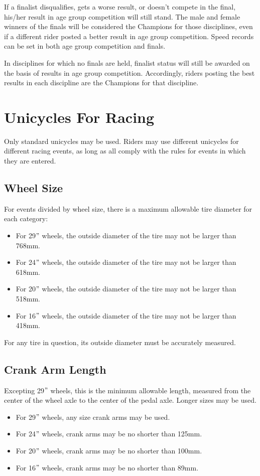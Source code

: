 If a finalist disqualifies, gets a worse result, or doesn’t compete in the final, his/her result in age group competition will still stand.
The male and female winners of the finals will be considered the Champions for those disciplines, even if a different rider posted a better result in age group competition.
Speed records can be set in both age group competition and finals.

In disciplines for which no finals are held, finalist status will still be awarded on the basis of results in age group competition.
Accordingly, riders posting the best results in each discipline are the Champions for that discipline.

\section{Unicycles For Racing}
Only standard unicycles may be used.
Riders may use different unicycles for different racing events, as long as all comply with the rules for events in which they are entered.

\subsection{Wheel Size}
For events divided by wheel size, there is a maximum allowable tire diameter for each category: 
\begin{itemize}
\item For 29$"$ wheels, the outside diameter of the tire may not be larger than 768mm.
\item For 24$"$ wheels, the outside diameter of the tire may not be larger than 618mm.
\item For 20$"$ wheels, the outside diameter of the tire may not be larger than 518mm.
\item For 16$"$ wheels, the outside diameter of the tire may not be larger than 418mm.
\end{itemize}
For any tire in question, its outside diameter must be accurately measured.

\subsection{Crank Arm Length}
Excepting 29$"$ wheels, this is the minimum allowable length, measured from the center of the wheel axle to the center of the pedal axle.
Longer sizes may be used.
\begin{itemize}
\item For 29$"$ wheels, any size crank arms may be used.
\item For 24$"$ wheels, crank arms may be no shorter than 125mm.
\item For 20$"$ wheels, crank arms may be no shorter than 100mm.
\item For 16$"$ wheels, crank arms may be no shorter than 89mm.
\end{itemize}

